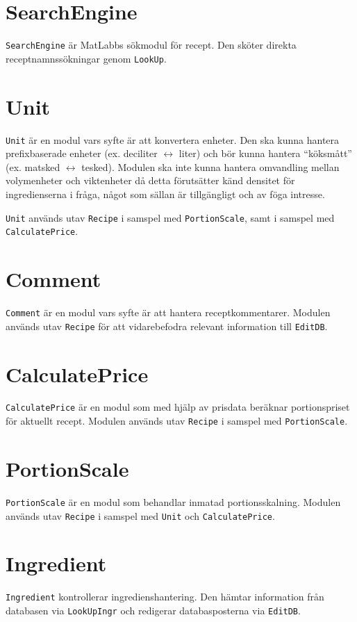 \section{SearchEngine}\label{sec:ark.search}
\verb=SearchEngine= är MatLabbs sökmodul för recept. Den sköter direkta receptnamnssökningar genom \verb=LookUp=.

\section{Unit}\label{sec:ark.unit}
\verb=Unit= är en modul vars syfte är att konvertera enheter. Den ska kunna hantera prefixbaserade enheter (ex. deciliter $\leftrightarrow$ liter) och bör kunna hantera ``köksmått'' (ex. matsked $\leftrightarrow$ tesked). Modulen ska inte kunna hantera omvandling mellan volymenheter och viktenheter då detta förutsätter känd densitet för ingredienserna i fråga, något som sällan är tillgängligt och av föga intresse.

\verb=Unit= används utav \verb=Recipe= i samspel med \verb=PortionScale=, samt i samspel med \verb=CalculatePrice=.

\section{Comment}\label{sec:ark.comment}
\verb=Comment= är en modul vars syfte är att hantera receptkommentarer. Modulen används utav \verb=Recipe= för att vidarebefodra relevant information till \verb=EditDB=.

\section{CalculatePrice}\label{sec:ark.calcprice}
\verb=CalculatePrice= är en modul som med hjälp av prisdata beräknar portionspriset för aktuellt recept. Modulen används utav \verb=Recipe= i samspel med \verb=PortionScale=.

\section{PortionScale}\label{sec:ark.portscale}
\verb=PortionScale= är en modul som behandlar inmatad portionsskalning. Modulen används utav \verb=Recipe= i samspel med \verb=Unit= och \verb=CalculatePrice=.

\section{Ingredient}\label{sec:ark. Ingredient}
\verb=Ingredient= kontrollerar ingredienshantering. Den hämtar information från databasen via \verb=LookUpIngr= och redigerar databasposterna via \verb=EditDB=.

